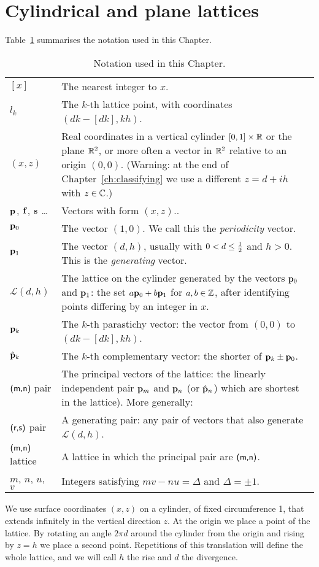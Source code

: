 \section{Cylindrical and plane lattices}\label{sec:latticedef}
Table~\ref{tab:notation} summarises the notation used in this Chapter.
%
\begin{table}
		\caption{Notation used in this Chapter.}
			\label{tab:notation}\begin{tabularx}{\textwidth}{l|X}
			\hline
		$[x]$ & The nearest integer to $x$. 
		\\
			$l_k$ & The $k$-th lattice point, with coordinates $(dk - [dk],kh)$. 
				\\
				$(x,z)$ & Real coordinates in a vertical cylinder $[0,1]\times\mathbb{R}$ or the plane $\mathbb{R}^2$, or more often a vector in $\mathbb{R}^2$ relative to an origin $(0,0)$. (Warning: at the end of Chapter~\ref{ch:classifying} we use a different $z=d+ih$ with $z\in\mathbb{C}$.)
				\\
				${\mathbf p}_{}$, $\mathbf{f}$, $\mathbf{s}$ \ldots & Vectors with form $(x,z)$..
				\\
				${\mathbf p}_{0}$ & The vector $(1,0)$. We call this the \textit{periodicity} vector.
				\\
				${\mathbf p}_{1}$ & The vector $(d,h)$, usually with $0< d\leq \textstyle{\frac{1}{2}}$ and $h>0$. This is the \textit{generating} vector. 
		\\
				$\mathcal{L}(d,h)$ & The lattice on the cylinder generated by the vectors ${\mathbf p}_{0}$ and ${\mathbf p}_{1}$:	the set $a{\mathbf p}_{0}+b{\mathbf p}_{1}$ for $a,b\in \mathbb{Z}$, after identifying points differing by an integer in $x$. 
				\\
				${\mathbf p}_{k}$ & The $k$-th parastichy vector: the vector from $(0,0)$ to $(dk-[dk],kh)$.
				\\
				$\hat{\mathbf p}_{k}$ & The $k$-th complementary vector: the shorter of ${\mathbf p}_{k}\pm{\mathbf p}_{0}$.
				\\
				$\textsf{(m,n)}$ pair & The principal vectors of the lattice: the linearly independent pair $	{\mathbf p}_{m}$ and ${\mathbf p}_{n}$ (or $\hat{\mathbf p}_{n}$)  which are shortest in the lattice). More generally:
				\\
				$\textsf{(r,s)}$ pair & A generating pair: any pair of vectors that also generate $\mathcal{L}(d,h)$.
				\\
				$\textsf{(m,n)}$ lattice & A lattice in which the principal pair 
				are $\textsf{(m,n)}$.
				\\
				$m$, $n$, $u$, $v$ & Integers satisfying $m v- n u=\Delta$ and $\Delta=\pm 1$.
				\\\hline
\end{tabularx} 
\end{table}
%
We use surface coordinates $(x,z)$ on a cylinder, of fixed circumference 1, that extends infinitely in the vertical direction $z$.  At the origin we place a point of the lattice. By rotating an angle $2\pi d$ around the cylinder from the origin and rising by $z=h$
we place a second point. Repetitions of this translation will define the whole lattice,  and we will call  
$h$ the {rise} and $d$ the divergence. 


